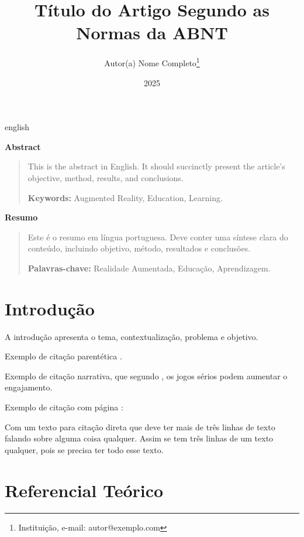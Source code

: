 \documentclass[12pt,oneside]{article}
\title{Título do Artigo Segundo as Normas da ABNT}
\author{Autor(a) Nome Completo\thanks{Instituição, e-mail: autor@exemplo.com}}
\date{2025}
\newenvironment{resumoEng}{%
  \par\vspace{1em}%
  \begin{center}\bfseries Abstract\end{center}%
  \begin{quotation}%
}{\end{quotation}}
\newenvironment{resumoPort}{%
  \par\vspace{1em}%
  \begin{center}\bfseries Resumo\end{center}%
  \begin{quotation}%
}{\end{quotation}}
\begin{document}
\maketitle

\begin{otherlanguage*}{english}
\begin{resumoEng}
This is the abstract in English. It should succinctly present the article’s
objective, method, results, and conclusions.

\textbf{Keywords:} Augmented Reality, Education, Learning.
\end{resumoEng}
\end{otherlanguage*}

\begin{resumoPort}
Este é o resumo em língua portuguesa. Deve conter uma síntese clara do conteúdo,
incluindo objetivo, método, resultados e conclusões.

\textbf{Palavras-chave:} Realidade Aumentada, Educação, Aprendizagem.
\end{resumoPort}

\section{Introdução}\label{sec:introducao}

A introdução apresenta o tema, contextualização, problema e objetivo.  

Exemplo de citação parentética \parencite{albuquerqueToyUserInterfaces2021}.  

Exemplo de citação narrativa, que segundo
\textcite{aragaoEnsinoProgramacaoPensamento2023}, os jogos sérios podem aumentar
o engajamento.

Exemplo de citação com página
\cite[p.~25]{azumaRecentAdvancesAugmentedReality2001}:
\begin{displayquote}
\small
Com um texto para citação direta que deve ter mais de três linhas de texto
falando sobre alguma coisa qualquer. Assim se tem três linhas de um texto
qualquer, pois se precisa ter todo esse texto.
\end{displayquote}


\section{Referencial Teórico}\label{sec:referencialTeorico}
\end{document}
